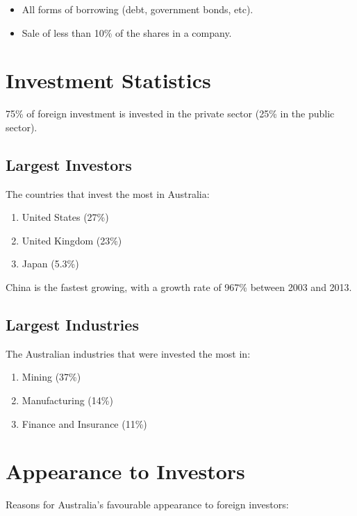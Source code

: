 \documentclass[a4paper,11pt]{report}
\begin{document}
\begin{itemize}
\item All forms of borrowing (debt, government bonds, etc).
\item Sale of less than 10\% of the shares in a company.
\end{itemize}


\section{Investment Statistics}

75\% of foreign investment is invested in the private sector (25\% in the
public sector).

\subsection{Largest Investors}

The countries that invest the most in Australia:

\begin{enumerate}
\item United States (27\%)
\item United Kingdom (23\%)
\item Japan (5.3\%)
\end{enumerate}

China is the fastest growing, with a growth rate of 967\% between 2003 and
2013.

\subsection{Largest Industries}

The Australian industries that were invested the most in:

\begin{enumerate}
\item Mining (37\%)
\item Manufacturing (14\%)
\item Finance and Insurance (11\%)
\end{enumerate}


\section{Appearance to Investors}

Reasons for Australia's favourable appearance to foreign investors:
\end{document}
